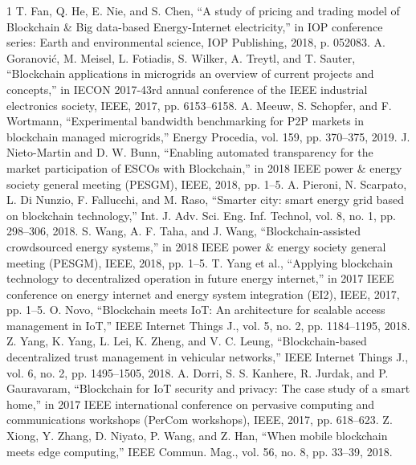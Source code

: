 \documentclass[lettersize,journal]{IEEEtran}
\begin{document}
\begin{thebibliography}{1}
\bibitem{}T. Fan, Q. He, E. Nie, and S. Chen, “A study of pricing and trading model of Blockchain \& Big data-based Energy-Internet electricity,” in IOP conference series: Earth and environmental science, IOP Publishing, 2018, p. 052083.
\bibitem{}A. Goranović, M. Meisel, L. Fotiadis, S. Wilker, A. Treytl, and T. Sauter, “Blockchain applications in microgrids an overview of current projects and concepts,” in IECON 2017-43rd annual conference of the IEEE industrial electronics society, IEEE, 2017, pp. 6153–6158.
\bibitem{}A. Meeuw, S. Schopfer, and F. Wortmann, “Experimental bandwidth benchmarking for P2P markets in blockchain managed microgrids,” Energy Procedia, vol. 159, pp. 370–375, 2019.
\bibitem{}J. Nieto-Martin and D. W. Bunn, “Enabling automated transparency for the market participation of ESCOs with Blockchain,” in 2018 IEEE power \& energy society general meeting (PESGM), IEEE, 2018, pp. 1–5.
\bibitem{}A. Pieroni, N. Scarpato, L. Di Nunzio, F. Fallucchi, and M. Raso, “Smarter city: smart energy grid based on blockchain technology,” Int. J. Adv. Sci. Eng. Inf. Technol, vol. 8, no. 1, pp. 298–306, 2018.
\bibitem{}S. Wang, A. F. Taha, and J. Wang, “Blockchain-assisted crowdsourced energy systems,” in 2018 IEEE power \& energy society general meeting (PESGM), IEEE, 2018, pp. 1–5.
\bibitem{}T. Yang et al., “Applying blockchain technology to decentralized operation in future energy internet,” in 2017 IEEE conference on energy internet and energy system integration (EI2), IEEE, 2017, pp. 1–5.
\bibitem{}O. Novo, “Blockchain meets IoT: An architecture for scalable access management in IoT,” IEEE Internet Things J., vol. 5, no. 2, pp. 1184–1195, 2018.
\bibitem{}Z. Yang, K. Yang, L. Lei, K. Zheng, and V. C. Leung, “Blockchain-based decentralized trust management in vehicular networks,” IEEE Internet Things J., vol. 6, no. 2, pp. 1495–1505, 2018.
\bibitem{}A. Dorri, S. S. Kanhere, R. Jurdak, and P. Gauravaram, “Blockchain for IoT security and privacy: The case study of a smart home,” in 2017 IEEE international conference on pervasive computing and communications workshops (PerCom workshops), IEEE, 2017, pp. 618–623.
\bibitem{}Z. Xiong, Y. Zhang, D. Niyato, P. Wang, and Z. Han, “When mobile blockchain meets edge computing,” IEEE Commun. Mag., vol. 56, no. 8, pp. 33–39, 2018.
\end{thebibliography}
\end{document}
